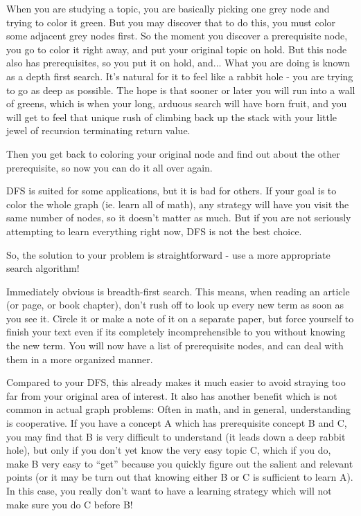 When you are studying a topic, you are basically picking one grey node and
trying to color it green. But you may discover that to do this, you must color
some adjacent grey nodes first. So the moment you discover a prerequisite
node, you go to color it right away, and put your original topic on hold. But
this node also has prerequisites, so you put it on hold, and... What you are
doing is known as a depth first search. It's natural for it to feel like a
rabbit hole - you are trying to go as deep as possible. The hope is that
sooner or later you will run into a wall of greens, which is when your long,
arduous search will have born fruit, and you will get to feel that unique rush
of climbing back up the stack with your little jewel of recursion terminating
return value.

Then you get back to coloring your original node and find out about the other
prerequisite, so now you can do it all over again.

DFS is suited for some applications, but it is bad for others. If your goal is
to color the whole graph (ie. learn all of math), any strategy will have you
visit the same number of nodes, so it doesn't matter as much. But if you are
not seriously attempting to learn everything right now, DFS is not the best
choice.


So, the solution to your problem is straightforward - use a more appropriate
search algorithm!

Immediately obvious is breadth-first search. This means, when reading an
article (or page, or book chapter), don't rush off to look up every new term
as soon as you see it. Circle it or make a note of it on a separate paper, but
force yourself to finish your text even if its completely incomprehensible to
you without knowing the new term. You will now have a list of prerequisite
nodes, and can deal with them in a more organized manner.

Compared to your DFS, this already makes it much easier to avoid straying too
far from your original area of interest. It also has another benefit which is
not common in actual graph problems: Often in math, and in general,
understanding is cooperative. If you have a concept A which has prerequisite
concept B and C, you may find that B is very difficult to understand (it leads
down a deep rabbit hole), but only if you don't yet know the very easy topic
C, which if you do, make B very easy to ``get'' because you quickly figure out
the salient and relevant points (or it may be turn out that knowing either B
or C is sufficient to learn A). In this case, you really don't want to have a
learning strategy which will not make sure you do C before B!

